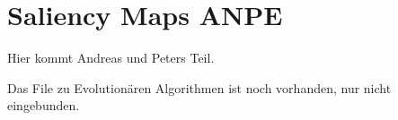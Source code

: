 \chapter{Saliency Maps ANPE}
Hier kommt Andreas und Peters Teil.

Das File zu Evolutionären Algorithmen ist noch vorhanden, nur nicht eingebunden.